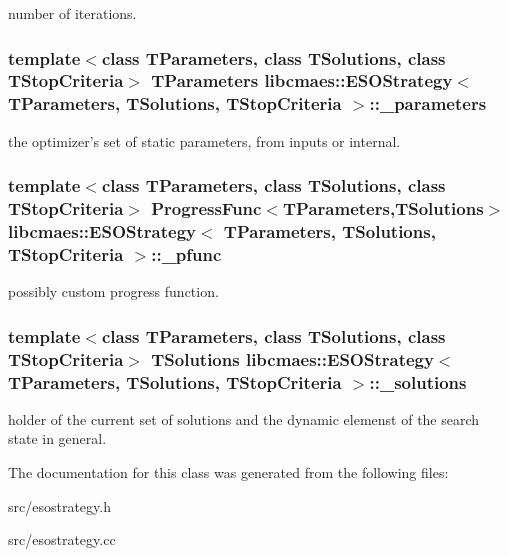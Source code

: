 number of iterations. \hypertarget{classlibcmaes_1_1ESOStrategy_a295e49238ceef8f11b3fb35296a8364a}{
\subsubsection[{\-\_\-parameters}]{\setlength{\rightskip}{0pt plus 5cm}template$<$class T\-Parameters, class T\-Solutions, class T\-Stop\-Criteria$>$ T\-Parameters {\bf libcmaes\-::\-E\-S\-O\-Strategy}$<$ T\-Parameters, T\-Solutions, T\-Stop\-Criteria $>$\-::\-\_\-parameters}}\label{classlibcmaes_1_1ESOStrategy_a295e49238ceef8f11b3fb35296a8364a}
the optimizer's set of static parameters, from inputs or internal. \hypertarget{classlibcmaes_1_1ESOStrategy_a25d597189596f434a2530887fddea189}{
\subsubsection[{\-\_\-pfunc}]{\setlength{\rightskip}{0pt plus 5cm}template$<$class T\-Parameters, class T\-Solutions, class T\-Stop\-Criteria$>$ Progress\-Func$<$T\-Parameters,T\-Solutions$>$ {\bf libcmaes\-::\-E\-S\-O\-Strategy}$<$ T\-Parameters, T\-Solutions, T\-Stop\-Criteria $>$\-::\-\_\-pfunc}}\label{classlibcmaes_1_1ESOStrategy_a25d597189596f434a2530887fddea189}
possibly custom progress function. \hypertarget{classlibcmaes_1_1ESOStrategy_a8fe0f8dc2201951e9e4ed2768b5a09ab}{
\subsubsection[{\-\_\-solutions}]{\setlength{\rightskip}{0pt plus 5cm}template$<$class T\-Parameters, class T\-Solutions, class T\-Stop\-Criteria$>$ T\-Solutions {\bf libcmaes\-::\-E\-S\-O\-Strategy}$<$ T\-Parameters, T\-Solutions, T\-Stop\-Criteria $>$\-::\-\_\-solutions}}\label{classlibcmaes_1_1ESOStrategy_a8fe0f8dc2201951e9e4ed2768b5a09ab}
holder of the current set of solutions and the dynamic elemenst of the search state in general. 

The documentation for this class was generated from the following files\-:\begin{DoxyCompactItemize}
\item 
src/esostrategy.\-h\item 
src/esostrategy.\-cc\end{DoxyCompactItemize}
